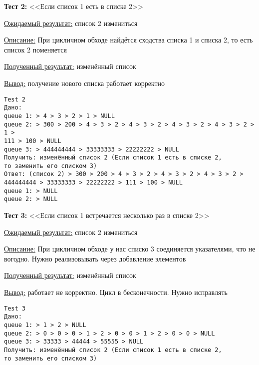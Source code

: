 \documentclass[12pt, a4paper]{article}
\begin{document}
\textbf{Тест 2:} <<Если список 1 есть в списке 2>>

\underline{Ожидаемый результат:} список 2 измениться

\underline{Описание:} При цикличном обходе найдётся сходства списка 1 и списка 2, то есть список 2 поменяется

\underline{Полученный результат:} изменённый список

\underline{Вывод:} получение нового списка работает корректно

\begin{tcolorbox}
\begin{verbatim}
Test 2
Дано:
queue 1: > 4 > 3 > 2 > 1 > NULL
queue 2: > 300 > 200 > 4 > 3 > 2 > 4 > 3 > 2 > 4 > 3 > 2 > 4 > 3 > 2 > 1 >
111 > 100 > NULL
queue 3: > 444444444 > 33333333 > 22222222 > NULL
Получить: изменённый список 2 (Если список 1 есть в списке 2,
то заменить его списком 3)
Ответ: (список 2) > 300 > 200 > 4 > 3 > 2 > 4 > 3 > 2 > 4 > 3 > 2 >
444444444 > 33333333 > 22222222 > 111 > 100 > NULL
queue 1: > NULL
queue 2: > NULL
\end{verbatim}
\end{tcolorbox}

\textbf{Тест 3:} <<Если список 1 встречается несколько раз в списке 2>>

\underline{Ожидаемый результат:} список 2 измениться

\underline{Описание:} При цикличном обходе у нас списко 3 соединяется указателями, что не вогодно. Нужно реализовывать через добавление элементов

\underline{Полученный результат:} изменённый список

\underline{Вывод:} работает не корректно. Цикл в бесконечности. Нужно исправлять

\begin{tcolorbox}
\begin{verbatim}
Test 3
Дано:
queue 1: > 1 > 2 > NULL
queue 2: > 0 > 0 > 0 > 1 > 2 > 0 > 0 > 1 > 2 > 0 > 0 > NULL
queue 3: > 33333 > 44444 > 55555 > NULL
Получить: изменённый список 2 (Если список 1 есть в списке 2,
то заменить его списком 3)
\end{verbatim}
\end{tcolorbox}

\end{document}
